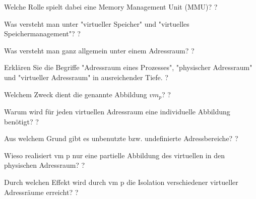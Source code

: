 \documentclass[avery5371]{flashcards}
\begin{document}
\begin{flashcard}[Speichermanagement]{Welche Rolle spielt dabei eine Memory Management Unit (MMU)? }
    ?
\end{flashcard}

\begin{flashcard}[Speichermanagement]{Was versteht man unter "virtueller Speicher" und "virtuelles Speichermanagement"? }
    ?
\end{flashcard}

\begin{flashcard}[Speichermanagement]{Was versteht man ganz allgemein unter einem Adressraum? }
    ?
\end{flashcard}

\begin{flashcard}[Speichermanagement]{Erklären Sie die Begriffe "Adressraum eines Prozesses", "physischer Adressraum" und "virtueller Adressraum" in ausreichender Tiefe. }
    ?
\end{flashcard}

\begin{flashcard}[Speichermanagement]{Welchem Zweck dient die genannte Abbildung $vm_p$? }
    ?
\end{flashcard}

\begin{flashcard}[Speichermanagement]{Warum wird für jeden virtuellen Adressraum eine individuelle Abbildung benötigt?}
    ?
\end{flashcard}

\begin{flashcard}[Speichermanagement]{Aus welchem Grund gibt es unbenutzte bzw. undefinierte Adressbereiche? }
    ?
\end{flashcard}

\begin{flashcard}[Speichermanagement]{Wieso realisiert vm p nur eine partielle Abbildung des virtuellen in den physischen Adressraum? }
    ?
\end{flashcard}

\begin{flashcard}[Speichermanagement]{Durch welchen Effekt wird durch vm p die Isolation verschiedener virtueller Adressräume erreicht? }
    ?
\end{flashcard}
\end{document}
